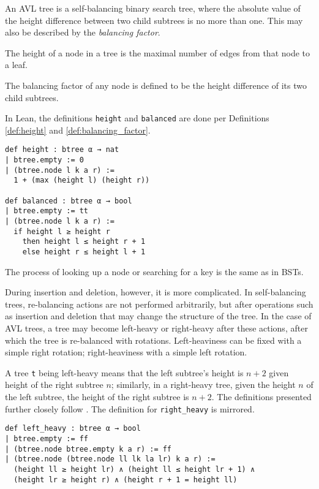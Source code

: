 An AVL tree \cite{avl:original} is a self-balancing binary search tree, where the absolute value of the height difference between two child subtrees is no more than one. 
This may also be described by the \textit{balancing factor}.

\begin{definition}
  \label{def:height}
  The height of a node in a tree is the maximal number of edges from that node to a leaf.
\end{definition}

\begin{definition}
  \label{def:balancing_factor}
  The balancing factor of any node is defined to be the height difference of its two child subtrees.
\end{definition}

In Lean, the definitions \lstinline{height} and \lstinline{balanced} are done per Definitions \ref{def:height} and \ref{def:balancing_factor}.

\begin{lstlisting}
def height : btree α → nat
| btree.empty := 0
| (btree.node l k a r) :=
  1 + (max (height l) (height r))

def balanced : btree α → bool
| btree.empty := tt
| (btree.node l k a r) :=
  if height l ≥ height r 
    then height l ≤ height r + 1
    else height r ≤ height l + 1
\end{lstlisting}

The process of looking up a node or searching for a key is the same as in BSTs. 

During insertion and deletion, however, it is more complicated. In self-balancing trees, re-balancing actions are not performed arbitrarily, but after operations such as insertion and deletion that may change the structure of the tree. In the case of AVL trees, a tree may become left-heavy or right-heavy after these actions, after which the tree is re-balanced with rotations. Left-heaviness can be fixed with a simple right rotation; right-heaviness with a simple left rotation. 

A tree \lstinline{t} being left-heavy means that the left subtree's height is $n+2$ given height of the right subtree $n$; similarly, in a right-heavy tree, given the height $n$ of the left subtree, the height of the right subtree is $n+2$. The definitions presented further closely follow \cite{textbook:discrete_computer}. The definition for \lstinline{right_heavy} is mirrored.

\begin{lstlisting}
def left_heavy : btree α → bool
| btree.empty := ff
| (btree.node btree.empty k a r) := ff
| (btree.node (btree.node ll lk la lr) k a r) :=
  (height ll ≥ height lr) ∧ (height ll ≤ height lr + 1) ∧
  (height lr ≥ height r) ∧ (height r + 1 = height ll)
\end{lstlisting}

